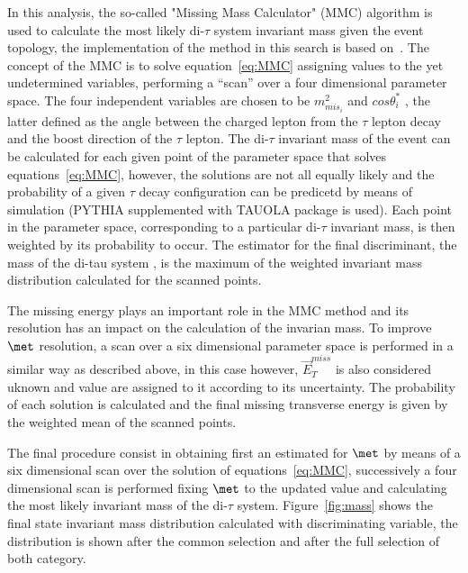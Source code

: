 In this analysis, the so-called "Missing Mass Calculator" (MMC) algorithm
is used to calculate the most likely di-$\tau$ system invariant mass given the event topology, %
the implementation of the method in this search is based on~\cite{MMC}. 
The concept of the MMC is to solve equation~\ref{eq:MMC} assigning values to the yet undetermined variables, performing a 
``scan'' over a four dimensional parameter space. The four independent  variables are chosen 
to be $ m^2_{mis_{i}}$ and $cos\theta^*_i$ , the latter defined
as the angle between the charged lepton from the $\tau$ lepton decay and the boost direction of the $\tau$ lepton. 
The di-$\tau$ invariant mass of the event can be calculated for each given point of the parameter space that solves equations~\ref{eq:MMC},
however, the solutions are not all equally likely and  the probability of a given $\tau$ decay configuration can be predicetd by means
of simulation (PYTHIA supplemented with TAUOLA package is used). Each point in the parameter space, corresponding
to a particular di-$\tau$ invariant mass, is then weighted by its probability to occur. 
The estimator for the final discriminant, the mass of the di-tau system \mmc, 
is the maximum of the weighted invariant mass distribution calculated for the scanned points.

The missing energy plays an important role in the MMC method and  its resolution has an impact on the calculation
of the invarian mass. To improve $\met$ resolution, a scan over a six dimensional parameter space is performed 
in a similar way as described above, in this case however, $\vec{E}_T^{miss}$ is also considered uknown and value are assigned 
to it according to its uncertainty. The probability of each solution is calculated and the final missing transverse
energy is given by the weighted mean of the scanned points. 

The final procedure consist in obtaining first an estimated for $\met$ by means of a six dimensional scan over the solution of equations~\ref{eq:MMC},
successively a four dimensional scan is performed fixing $\met$ to the updated value and calculating the most likely invariant mass 
of the di-$\tau$ system.
Figure~\ref{fig:mass} shows the final state invariant mass distribution calculated with  \mmc 
discriminating variable, the distribution is shown after the common selection and after the full selection
of both category. 

 


